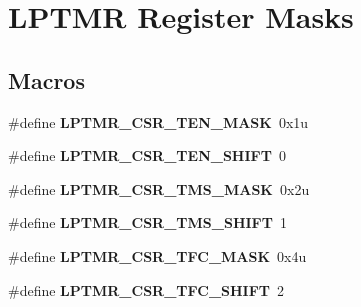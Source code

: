 \hypertarget{group___l_p_t_m_r___register___masks}{}\section{L\+P\+T\+MR Register Masks}
\label{group___l_p_t_m_r___register___masks}
\subsection*{Macros}
\begin{DoxyCompactItemize}
\item 
\mbox{\label{group___l_p_t_m_r___register___masks_ga4ed197f1cb8d0e954324b4854ff14a83}} 
\#define {\bfseries L\+P\+T\+M\+R\+\_\+\+C\+S\+R\+\_\+\+T\+E\+N\+\_\+\+M\+A\+SK}~0x1u
\item 
\mbox{\label{group___l_p_t_m_r___register___masks_gada00f24f79b11a91e8404b4531d66733}} 
\#define {\bfseries L\+P\+T\+M\+R\+\_\+\+C\+S\+R\+\_\+\+T\+E\+N\+\_\+\+S\+H\+I\+FT}~0
\item 
\mbox{\label{group___l_p_t_m_r___register___masks_ga57ee593a57d844d7bb4b87c127765558}} 
\#define {\bfseries L\+P\+T\+M\+R\+\_\+\+C\+S\+R\+\_\+\+T\+M\+S\+\_\+\+M\+A\+SK}~0x2u
\item 
\mbox{\label{group___l_p_t_m_r___register___masks_gaeac406c6a48e15c6ec5784fb891b51b6}} 
\#define {\bfseries L\+P\+T\+M\+R\+\_\+\+C\+S\+R\+\_\+\+T\+M\+S\+\_\+\+S\+H\+I\+FT}~1
\item 
\mbox{\label{group___l_p_t_m_r___register___masks_gaca581598c0f319b0002deda730479842}} 
\#define {\bfseries L\+P\+T\+M\+R\+\_\+\+C\+S\+R\+\_\+\+T\+F\+C\+\_\+\+M\+A\+SK}~0x4u
\item 
\mbox{\label{group___l_p_t_m_r___register___masks_gaee3d1b59f30f6217f1f74b18cf973c4a}} 
\#define {\bfseries L\+P\+T\+M\+R\+\_\+\+C\+S\+R\+\_\+\+T\+F\+C\+\_\+\+S\+H\+I\+FT}~2
\item 
\mbox{\label{group___l_p_t_m_r___register___masks_ga020eee1550f2943c10d51f8b56930e62}} 

\end{DoxyCompactItemize}
